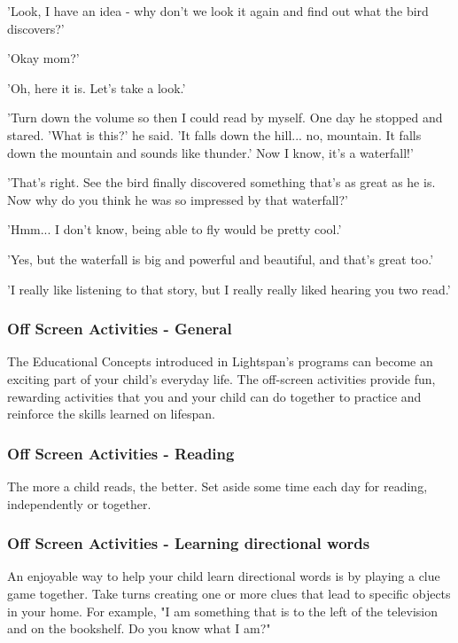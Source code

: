'Look, I have an idea - why don't we look it again and find out what the bird discovers?'

'Okay mom?'

'Oh, here it is. Let's take a look.'

'Turn down the volume so then I could read by myself. One day he stopped and stared. 'What is this?' he said. 'It falls down the hill... no, mountain. It falls down the mountain and sounds like thunder.' Now I know, it's a waterfall!'

'That's right. See the bird finally discovered something that's as great as he is. Now why do you think he was so impressed by that waterfall?'

'Hmm... I don't know, being able to fly would be pretty cool.'

'Yes, but the waterfall is big and powerful and beautiful, and that's great too.'

'I really like listening to that story, but I really really liked hearing you two read.'

\subsubsection{Off Screen Activities - General}

The Educational Concepts introduced in Lightspan's programs can become an exciting part of your child's everyday life.
The off-screen activities provide fun, rewarding activities that you and your child can do together to practice and reinforce the skills learned on lifespan.

\subsubsection{Off Screen Activities - Reading}

The more a child reads, the better.
Set aside some time each day for reading, independently or together.

\subsubsection{Off Screen Activities - Learning directional words}

An enjoyable way to help your child learn directional words is by playing a clue game together.
Take turns creating one or more clues that lead to specific objects in your home.
For example, "I am something that is to the left of the television and on the bookshelf. Do you know what I am?"

